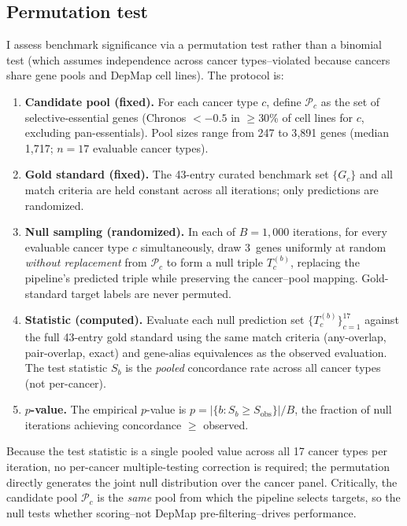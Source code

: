 \documentclass[11pt]{article}
\begin{document}
\subsection*{Permutation test}
I assess benchmark significance via a permutation test rather than a binomial test (which assumes independence across cancer types--violated because cancers share gene pools and DepMap cell lines). The protocol is:
\begin{enumerate}
\item \textbf{Candidate pool (fixed).} For each cancer type $c$, define $\mathcal{P}_c$ as the set of selective-essential genes (Chronos $< -0.5$ in $\geq$30\% of cell lines for $c$, excluding pan-essentials). Pool sizes range from 247 to 3{,}891 genes (median 1{,}717; $n = 17$ evaluable cancer types).
\item \textbf{Gold standard (fixed).} The 43-entry curated benchmark set $\{G_c\}$ and all match criteria are held constant across all iterations; only predictions are randomized.
\item \textbf{Null sampling (randomized).} In each of $B = 1{,}000$ iterations, for every evaluable cancer type $c$ simultaneously, draw 3~genes uniformly at random \emph{without replacement} from $\mathcal{P}_c$ to form a null triple $T_c^{(b)}$, replacing the pipeline's predicted triple while preserving the cancer--pool mapping. Gold-standard target labels are never permuted.
\item \textbf{Statistic (computed).} Evaluate each null prediction set $\{T_c^{(b)}\}_{c=1}^{17}$ against the full 43-entry gold standard using the same match criteria (any-overlap, pair-overlap, exact) and gene-alias equivalences as the observed evaluation. The test statistic $S_b$ is the \emph{pooled} concordance rate across all cancer types (not per-cancer).
\item \textbf{$p$-value.} The empirical $p$-value is $p = |\{b : S_b \geq S_{\text{obs}}\}| / B$, the fraction of null iterations achieving concordance $\geq$ observed.
\end{enumerate}
Because the test statistic is a single pooled value across all 17 cancer types per iteration, no per-cancer multiple-testing correction is required; the permutation directly generates the joint null distribution over the cancer panel. Critically, the candidate pool $\mathcal{P}_c$ is the \emph{same} pool from which the pipeline selects targets, so the null tests whether scoring--not DepMap pre-filtering--drives performance.
\end{document}

